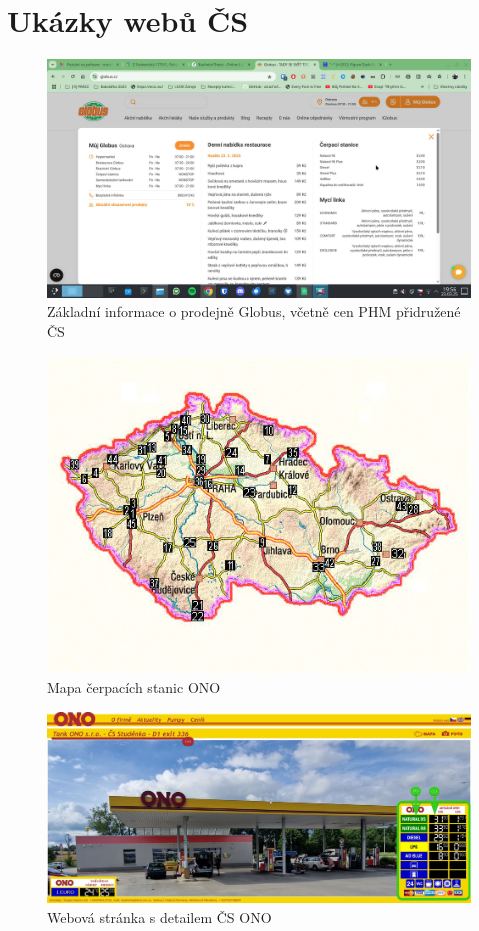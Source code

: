 \chapter{Ukázky webů ČS}

\begin{figure}
    \centering
    \includegraphics[width=\textwidth]{Figures/globus_vyber.jpg}
    \caption{Základní informace o prodejně Globus, včetně cen PHM
        přidružené ČS \cite{RlWZWiUaWElVCBZM}}
    \label{fig:globus-cs}
\end{figure}

\begin{figure}
    \centering
    \includegraphics[width=\textwidth]{Figures/map_pump.jpg}
    \caption{Mapa čerpacích stanic ONO \cite{9n9VUsIjBwGy4lUb}}
    \label{fig:tank-ono-mapa}
\end{figure}

\begin{figure}
    \centering
    \includegraphics[width=\textwidth]{Figures/tank-ono-cs.jpg}
    \caption{Webová stránka s detailem ČS ONO
        \cite{9n9VUsIjBwGy4lUb}}
    \label{fig:tank-ono-stranka}
\end{figure}

\endinput
